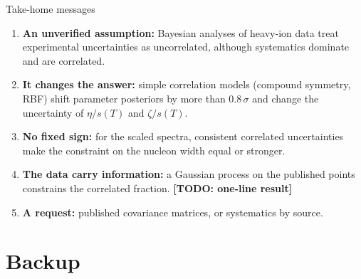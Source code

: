 \documentclass[aspectratio=169,10pt]{beamer}
\newcommand{\etas}{\eta/s}
\newcommand{\zetas}{\zeta/s}
\newcommand{\TODO}[1]{{\scriptsize\color{qcdRed}\textbf{[TODO: #1]}}}
\begin{document}
\begin{frame}{Take-home messages}
\begin{enumerate}
  \item<1-> \textbf{An unverified assumption:} Bayesian analyses of heavy-ion data treat experimental uncertainties as uncorrelated, although systematics dominate and are correlated.
  \item<2-> \textbf{It changes the answer:} simple correlation models (compound symmetry, RBF) shift parameter posteriors by more than $0.8\,\sigma$ and change the uncertainty of $\etas(T)$ and $\zetas(T)$.
  \item<3-> \textbf{No fixed sign:} for the scaled spectra, consistent correlated uncertainties make the constraint on the nucleon width equal or stronger.
  \item<4-> \textbf{The data carry information:} a Gaussian process on the published points constrains the correlated fraction. \TODO{one-line result}
  \item<5-> \textbf{A request:} published covariance matrices, or systematics by source.
\end{enumerate}
\vspace{4mm}
\centering
{}
\end{frame}

\appendix
\section{Backup}
\end{document}
